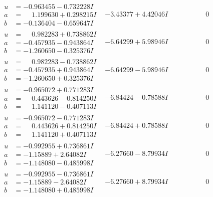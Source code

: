 \documentclass[1p]{elsarticle_modified}
\theoremstyle{definition}
\begin{document}
$$\begin{array}{c|c|c}
\begin{aligned}
u &= -0.963455 - 0.732228 I \\
a &= \phantom{-}1.199630 + 0.298215 I \\
b &= -0.136404 - 0.659647 I\end{aligned}
 & -3.43377 + 4.42046 I & \phantom{-0.000000 } 0 \\ \hline\begin{aligned}
u &= \phantom{-}0.982283 + 0.738862 I \\
a &= -0.457935 - 0.943864 I \\
b &= -1.260650 - 0.325376 I\end{aligned}
 & -6.64299 + 5.98946 I & \phantom{-0.000000 } 0 \\ \hline\begin{aligned}
u &= \phantom{-}0.982283 - 0.738862 I \\
a &= -0.457935 + 0.943864 I \\
b &= -1.260650 + 0.325376 I\end{aligned}
 & -6.64299 - 5.98946 I & \phantom{-0.000000 } 0 \\ \hline\begin{aligned}
u &= -0.965072 + 0.771283 I \\
a &= \phantom{-}0.443626 - 0.814250 I \\
b &= \phantom{-}1.141120 - 0.407113 I\end{aligned}
 & -6.84424 - 0.78588 I & \phantom{-0.000000 } 0 \\ \hline\begin{aligned}
u &= -0.965072 - 0.771283 I \\
a &= \phantom{-}0.443626 + 0.814250 I \\
b &= \phantom{-}1.141120 + 0.407113 I\end{aligned}
 & -6.84424 + 0.78588 I & \phantom{-0.000000 } 0 \\ \hline\begin{aligned}
u &= -0.992955 + 0.736861 I \\
a &= -1.15889 + 2.64082 I \\
b &= -1.148080 - 0.485998 I\end{aligned}
 & -6.27660 - 8.79934 I & \phantom{-0.000000 } 0 \\ \hline\begin{aligned}
u &= -0.992955 - 0.736861 I \\
a &= -1.15889 - 2.64082 I \\
b &= -1.148080 + 0.485998 I\end{aligned}
 & -6.27660 + 8.79934 I & \phantom{-0.000000 } 0\\

\end{array}$$
\end{document}
